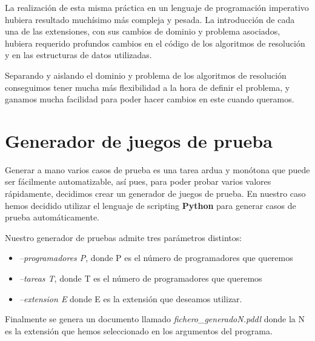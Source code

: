 \documentclass[11pt]{article}
\begin{document}
La realización de esta misma práctica en un lenguaje de programación imperativo hubiera resultado muchísimo más compleja y pesada. La introducción de cada una de las extensiones, con sus cambios de dominio y problema asociados, hubiera requerido profundos cambios en el código de los algoritmos de resolución y en las estructuras de datos utilizadas.

Separando y aislando el dominio y problema de los algoritmos de resolución conseguimos tener mucha más flexibilidad a la hora de definir el problema, y ganamos mucha facilidad para poder hacer cambios en este cuando queramos.

\newpage
\appendix
\appendixpage
\addappheadtotoc

\section{Generador de juegos de prueba}

Generar a mano varios casos de prueba es una tarea ardua y monótona que puede ser fácilmente automatizable, así pues, para poder probar varios valores rápidamente, decidimos crear un generador de juegos de prueba. En nuestro caso hemos decidido utilizar el lenguaje de scripting \textbf{Python} para generar casos de prueba automáticamente.
\medskip

Nuestro generador de pruebas admite tres parámetros distintos:
\begin{itemize}
	\item \textit{--programadores P}, donde P es el número de programadores que queremos
	\item \textit{--tareas T}, donde T es el número de programadores que queremos
	\item \textit{--extension E} donde E es la extensión que deseamos utilizar. 
\end{itemize}
\medskip
\noindent Finalmente se genera un documento llamado \textit{fichero\_generadoN.pddl} donde la N es la extensión que hemos seleccionado en los argumentos del programa. 
\end{document}
